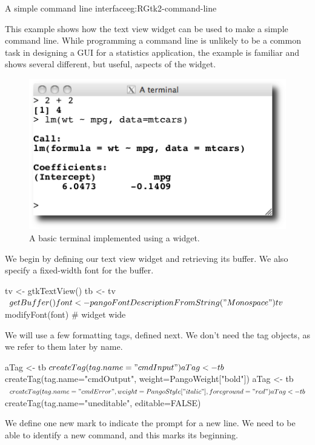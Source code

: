 \begin{example}{A simple command line interface}{eg:RGtk2-command-line}

This example shows how the text view widget can be used to make a
simple command line. While programming a command line is unlikely to
be a common task in designing a GUI for a statistics
application, the example is familiar and shows several different, but
useful, aspects of the widget.

\begin{figure}
  \centering
  \includegraphics[width=.6\textwidth]{ex-RGtk2-terminal}
  \caption{A basic \R\/ terminal implemented using a  widget.}
  \label{fig:RGtk2-terminal}
\end{figure}


We begin by defining our text view widget and retrieving its
buffer. We also specify a fixed-width font for the buffer.
\begin{Schunk}
\begin{Sinput}
 tv <- gtkTextView()
 tb <- tv$getBuffer()
 font <- pangoFontDescriptionFromString("Monospace")
 tv$modifyFont(font)                     # widget wide
\end{Sinput}
\end{Schunk}

We will use a few formatting tags, defined next. We don't need the tag
objects, as we refer to them later by name.
\begin{Schunk}
\begin{Sinput}
 aTag <- tb$createTag(tag.name="cmdInput")
 aTag <- tb$createTag(tag.name="cmdOutput", 
                      weight=PangoWeight["bold"])
 aTag <- tb$createTag(tag.name="cmdError", 
                      weight=PangoStyle["italic"], foreground="red")
 aTag <- tb$createTag(tag.name="uneditable", editable=FALSE)
\end{Sinput}
\end{Schunk}

We define one new mark to indicate the prompt for a new line. We
need to be able to identify a new command, and this marks its beginning.
\begin{Schunk}
\end{Schunk}


\end{example}
